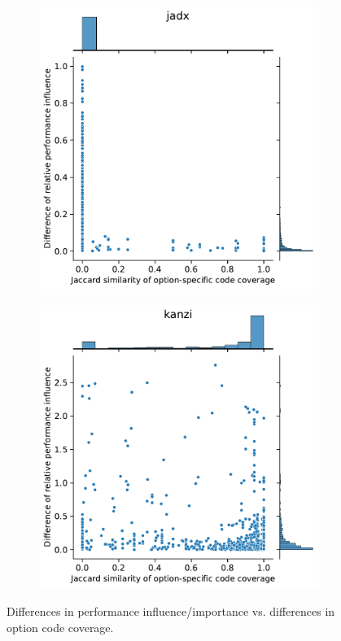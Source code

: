 {\begin{figure}
\begin{subfigure}{0.33\textwidth}
	\end{subfigure}
	\begin{subfigure}{0.33\textwidth}
		\centering
		\includegraphics[width=\linewidth]{images/rq3.2/jadx_rq3.2.pdf}
	\end{subfigure}
	\begin{subfigure}{0.33\textwidth}
		\centering
		\includegraphics[width=\linewidth]{images/rq3.2/kanzi_rq3.2.pdf}
	\end{subfigure}
	\caption{Differences in performance influence/importance vs. differences in option code coverage.}
	\label{fig:diff_performance_option_coverage}
\end{figure}

}
